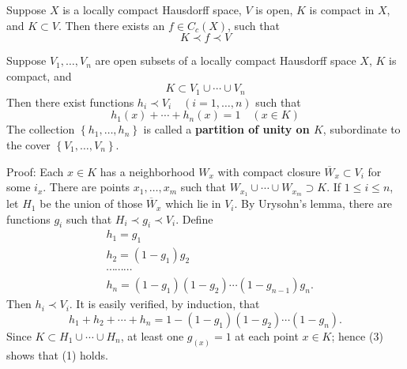 \documentclass[12pt, a4paper, oneside]{book}
\begin{document}
\begin{corollary}
    Suppose $X$ is a locally compact Hausdorff space, $V$ is open, $K$ is compact in $X$, and $K \subset V$. Then there exists an $f \in C_c(X)$, such that
    \begin{equation*}
        K \prec f\prec V
    \end{equation*}
\end{corollary}
\begin{theorem}
    Suppose $V_1, \ldots, V_n$ are open subsets of a locally compact Hausdorff space $X$, $K$ is compact, and
    $$
        K \subset V_1 \cup \cdots \cup V_n
    $$
    Then there exist functions $h_i \prec V_i \quad (i=1, \ldots, n)$ such that
    $$
        h_1(x)+\cdots+h_n(x)=1 \quad(x \in K)
    $$
    The collection $\left\{h_1, \ldots, h_n\right\}$ is called a \textbf{partition of unity on $K$}, subordinate to the cover $\left\{V_1, \ldots, V_n\right\}$.


    Proof:
    Each $x \in K$ has a neighborhood $W_x$ with compact closure $\overline{W}_x \subset V_i$ for some $i_x$. There are points $x_1, \ldots, x_m$ such that $W_{x_1} \cup \cdots \cup W_{x_m} \supset K$. If $1 \leq i \leq n$, let $H_1$ be the union of those $\overline{W}_x$ which lie in $V_i$. By Urysohn's lemma, there are functions $g_i$ such that $H_i \prec g_i \prec V_i$. Define
    \begin{equation*}
        \begin{aligned}
             & h_1=g_1                                                                     \\
             & h_2=\left(1-g_1\right) g_2                                                  \\
             & \cdots \cdots \cdots                                                        \\
             & h_n=\left(1-g_1\right)\left(1-g_2\right) \cdots\left(1-g_{n-1}\right) g_n .
        \end{aligned}
    \end{equation*}
    Then $h_i \prec V_i$. It is easily verified, by induction, that
    \begin{equation*}
        h_1+h_2+\cdots+h_n=1-\left(1-g_1\right)\left(1-g_2\right) \cdots\left(1-g_n\right) .
    \end{equation*}
    Since $K \subset H_1 \cup \cdots \cup H_n$, at least one $g_(x)=1$ at each point $x \in K$; hence (3) shows that (1) holds.
\end{theorem}
\end{document}
